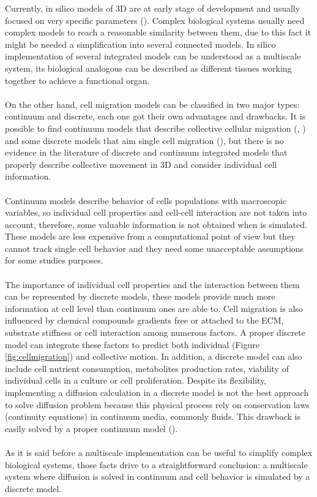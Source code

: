 Currently, in silico models of 3D are at early stage of development and usually focused on  very specific parameters (\cite{Palumbo2013}). Complex biological systems usually need complex models to reach a reasonable similarity between them, due to this fact it might be needed a simplification into several connected models. In silico implementation of several integrated models can be understood as a multiscale system, its biological analogous can be described as different tissues working together to achieve a functional organ.\\
\\
On the other hand, cell migration models can be classified in two major types: continuum and discrete, each one got their own advantages and drawbacks. It is possible to find continuum models that describe collective cellular migration (\cite{Arciero2011}, \cite{Moreo2008}) and some discrete models that aim single cell migration (\cite{Borau2011}), but there is no evidence in the literature of discrete and continuum integrated models that  properly describe collective movement in 3D and consider individual cell information.\\
\\
Continuum models describe behavior of cells populations with macroscopic variables, so individual cell properties and cell-cell interaction are not taken into account, therefore, some valuable information is not obtained when is simulated. These models are less expensive from a computational point of view but they cannot track single cell behavior and they need some unacceptable assumptions for some studies purposes. \\
\\
The importance of individual cell properties and the interaction between them can be represented by discrete models, these models provide much more information at cell level than continuum ones are able to. Cell migration is also influenced by chemical compounds gradients free or attached to the ECM, substrate stiffness or cell interaction among numerous factors. A proper discrete model can integrate these factors to predict both individual (Figure \ref{fig:cellmigration}) and collective motion. In addition, a discrete model can also include cell nutrient consumption, metabolites production rates, viability of individual cells in a culture or cell proliferation. Despite its flexibility, implementing a diffusion calculation in a discrete model is not the best approach to solve diffusion problem because this physical process rely on conservation laws (continuity equations) in continuum media, commonly fluids. This drawback is easily solved by a proper continuum model (\cite{Chauviere2010}).\\ 
\\
As it is said before a multiscale implementation can be useful to simplify complex biological systems, those facts drive to a straightforward conclusion: a multiscale system where diffusion  is solved in continuum and cell behavior is simulated by a discrete model.\\
\\ 